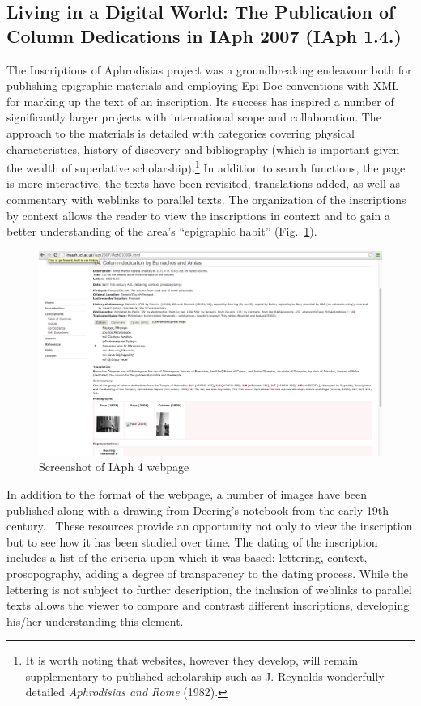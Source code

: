 \documentclass[amsthm,ebook]{saparticle}
\begin{document}
\subsection{Living in a Digital World: The Publication of Column Dedications in IAph 2007 (IAph 1.4.)}
The Inscriptions of Aphrodisias project was a groundbreaking endeavour both for publishing epigraphic materials and
employing Epi Doc conventions with XML for marking up the text of an inscription. Its success has inspired a number of
significantly larger projects with international scope and collaboration. The approach to the materials is detailed
with categories covering physical characteristics, history of discovery and bibliography (which is important given the
wealth of superlative scholarship).\footnote{ It is worth noting that websites, however they develop, will remain
supplementary to published scholarship such as J. Reynolds wonderfully detailed \emph{Aphrodisias and Rome} (1982).} In addition to search functions, the page is more interactive, the texts
have been revisited, translations added, as well as commentary with weblinks to parallel texts. The organization of the
inscriptions by context allows the reader to view the inscriptions in context and to gain a better understanding of the
area’s ``epigraphic habit'' (Fig.~\ref{fig:1}).




\begin{figure}[!hbp]
\centering
 \includegraphics[width=\columnwidth]{PaperproposalforEAGLEfinal-img001.png}
\caption{Screenshot of IAph 4 webpage}
\label{fig:1}
\end{figure}

\newpage
In addition to the format of the webpage, a number of images have been published along with a drawing from Deering’s
notebook from the early 19th century. \ These resources provide an opportunity not only to view the inscription but to
see how it has been studied over time. The dating of the inscription includes a list of the criteria upon which it was
based: lettering, context, prosopography, adding a degree of transparency to the dating process. While the lettering is
not subject to further description, the inclusion of weblinks to parallel texts allows the viewer to compare and
contrast different inscriptions, developing his/her understanding this element. 
\end{document}

